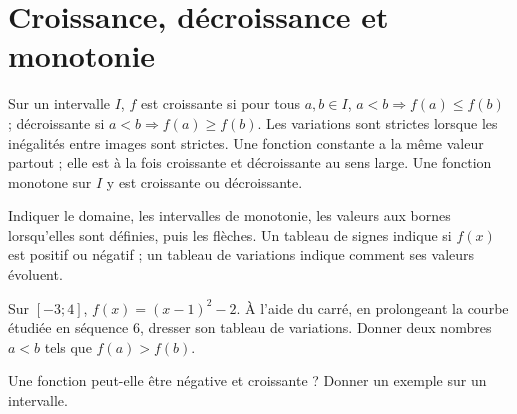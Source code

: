 \section{Croissance, décroissance et monotonie}
\begin{keypoint}[Définitions]
Sur un intervalle $I$, $f$ est croissante si pour tous $a,b\in I$, $a<b\Rightarrow f(a)\leq f(b)$ ; décroissante si $a<b\Rightarrow f(a)\geq f(b)$. Les variations sont strictes lorsque les inégalités entre images sont strictes. Une fonction constante a la même valeur partout ; elle est à la fois croissante et décroissante au sens large.
Une fonction monotone sur $I$ y est croissante ou décroissante.
\end{keypoint}
\begin{method}
Indiquer le domaine, les intervalles de monotonie, les valeurs aux bornes lorsqu'elles sont définies, puis les flèches. Un tableau de signes indique si $f(x)$ est positif ou négatif ; un tableau de variations indique comment ses valeurs évoluent.
\end{method}
\begin{example}Sur $[-3;4]$, $f(x)=(x-1)^2-2$. À l'aide du carré, en prolongeant la courbe étudiée en séquence 6, dresser son tableau de variations. Donner deux nombres $a<b$ tels que $f(a)>f(b)$.\end{example}
\begin{example}Une fonction peut-elle être négative et croissante ? Donner un exemple sur un intervalle.\end{example}

